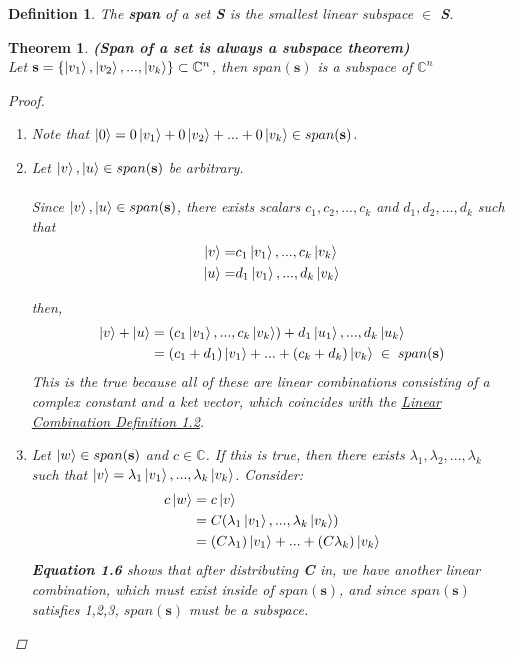\documentclass[12pt]{article}
\theoremstyle{plain}
\newtheorem{theorem}[lemma]{Theorem}
\theoremstyle{nonumberplain}
\theoremstyle{plain}
\newtheorem{definition}[lemma]{Definition}
\theoremstyle{nonumberplain}
\newtheorem{proof}{Proof.}
\newcommand\1{{\bf 1}}
\newcommand{\C}{\mathbb{C}} %
\newcommand{\<}{\left\langle}
\renewcommand{\>}{\right\rangle}
\begin{document}
\begin{definition}
The \textbf{span} of a set \textbf{S} is the smallest linear subspace $\in$ \textbf{S}.  
\end{definition}

\begin{theorem}
\textbf{(Span of a set is always a subspace theorem)}\\
Let $\mathbf{s} = \{ \ket{v_1}, \ket{v_2}, ... , \ket{v_k} \} \subset \C^n$, then $span(\mathbf{s})$ is a subspace of $\C^n$
\\
\begin{proof} \renewcommand{\qedsymbol}{}
\begin{enumerate}
\item Note that $\ket{0} = 0\ket{v_1} + 0\ket{v_2}  + ... + 0\ket{v_k} \in span(\mathbf{s})$. 
\item Let $\ket{v}, \ket{u} \in span(\mathbf{s})$ be arbitrary. \\
\\ 
Since  $\ket{v}, \ket{u} \in span(\mathbf{s})$, there exists scalars $c_1, c_2, ... , c_k$ and $d_1, d_2, ... , d_k$ such that 
\begin{align*}
\ket{v} = &c_1\ket{v_1}, ... ,  c_k\ket{v_k} \\
\ket{u} = &d_1\ket{v_1}, ... ,  d_k\ket{v_k}
\end{align*}

then, 
\begin{align*}
\ket{v} + \ket{u} &= (c_1\ket{v_1}, ... ,  c_k\ket{v_k}) +   d_1\ket{u_1}, ... ,  d_k\ket{u_k}\\
 &= (c_1 + d_1)\ket{v_1} + ... + (c_k + d_k)\ket{v_k}\; \in\; span(\mathbf{s})
\end{align*}
This is the true because all of these are linear combinations consisting of a complex constant and a ket vector, which coincides with the \hyperref[def:Combination]{Linear Combination Definition 1.2}.\\
\item Let $\ket{w} \in span(\mathbf{s})$ and $c \in \C$.
If this is true, then there exists $\lambda_1, \lambda_2, ... , \lambda_k$ such that $\ket{v} = \lambda_1\ket{v_1}, ... ,  \lambda_k\ket{v_k}$.  Consider: 
\begin{equation} 
\begin{split}
c\ket{w} &= c\ket{v} \\
&= C(\lambda_1\ket{v_1}, ... ,  \lambda_k\ket{v_k}) \\
&= (C\lambda_1)\ket{v_1} + ... + (C\lambda_k)\ket{v_k}
\end{split}
\end{equation}
\textbf{Equation 1.6} shows that after distributing \textbf{C} in, we have another linear combination, which must exist inside of $span(\mathbf{s})$, and since $span(\mathbf{s})$ satisfies 1,2,3, $span(\mathbf{s})$ must be a subspace.
\end{enumerate}
\end{proof}
\end{theorem}
\end{document}
